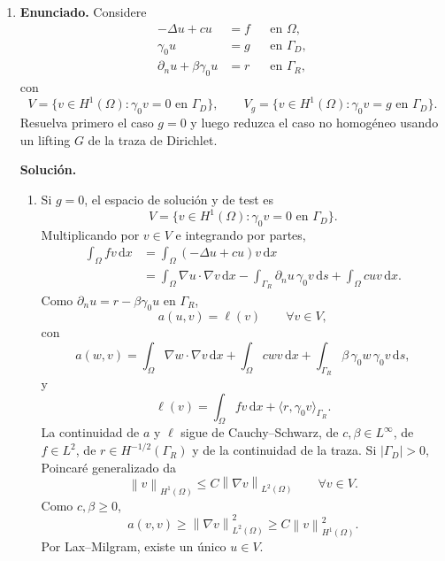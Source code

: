 \documentclass[11pt]{article}
\newcommand{\norm}[1]{\left\lVert #1\right\rVert}
\def\dx{\mbox{\(\,\mathrm{d}x\)}}
\def\ds{\mbox{\(\,\mathrm{d}s\)}}
\begin{document}
\begin{enumerate}[label=\textbf{\arabic*.}, leftmargin=*]

    \item \textbf{Enunciado.} Considere
    \[
    \begin{aligned}
        -\Delta u+cu&=f &&\text{en }\Omega,\\
        \gamma_0u&=g &&\text{en }\Gamma_D,\\
        \partial_nu+\beta\gamma_0u&=r &&\text{en }\Gamma_R,
    \end{aligned}
    \]
    con
    \[
        V=\{v\in H^1(\Omega):\gamma_0v=0\text{ en }\Gamma_D\},
        \qquad
        V_g=\{v\in H^1(\Omega):\gamma_0v=g\text{ en }\Gamma_D\}.
    \]
    Resuelva primero el caso $g=0$ y luego reduzca el caso no homogéneo usando un lifting $G$ de la traza de Dirichlet.

    \textbf{Solución.}
    \begin{enumerate}[label=(\alph*)]
        \item Si $g=0$, el espacio de solución y de test es
        \[
            V=\{v\in H^1(\Omega):\gamma_0v=0\text{ en }\Gamma_D\}.
        \]
        Multiplicando por $v\in V$ e integrando por partes,
        \begin{align*}
            \int_\Omega fv\dx
            &=
            \int_\Omega (-\Delta u+cu)v\dx\\
            &=
            \int_\Omega \nabla u\cdot\nabla v\dx
            -\int_{\Gamma_R}\partial_nu\,\gamma_0v\ds
            +\int_\Omega cuv\dx.
        \end{align*}
        Como $\partial_nu=r-\beta\gamma_0u$ en $\Gamma_R$,
        \[
            a(u,v)=\ell(v)\qquad\forall v\in V,
        \]
        con
        \[
            a(w,v)=
            \int_\Omega \nabla w\cdot\nabla v\dx
            +\int_\Omega cwv\dx
            +\int_{\Gamma_R}\beta\,\gamma_0w\,\gamma_0v\ds,
        \]
        y
        \[
            \ell(v)=\int_\Omega fv\dx+\langle r,\gamma_0v\rangle_{\Gamma_R}.
        \]
        La continuidad de $a$ y $\ell$ sigue de Cauchy--Schwarz, de $c,\beta\in L^\infty$, de $f\in L^2$, de $r\in H^{-1/2}(\Gamma_R)$ y de la continuidad de la traza. Si $|\Gamma_D|>0$, Poincaré generalizado da
        \[
            \norm{v}_{H^1(\Omega)}\le C\norm{\nabla v}_{L^2(\Omega)}
            \qquad\forall v\in V.
        \]
        Como $c,\beta\ge0$,
        \[
            a(v,v)\ge \norm{\nabla v}_{L^2(\Omega)}^2\ge C\norm{v}_{H^1(\Omega)}^2.
        \]
        Por Lax--Milgram, existe un único $u\in V$.


\end{enumerate}
\end{enumerate}
\end{document}
